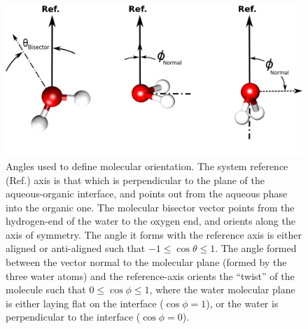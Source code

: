 \begin{figure}[h!]
\begin{center}
	\includegraphics[scale=1.0]{images/water-angles.png}
	\caption{Angles used to define molecular orientation. The system reference (Ref.) axis is that which is perpendicular to the plane of the aqueous-organic interface, and points out from the aqueous phase into the organic one. The molecular bisector vector points from the hydrogen-end of the water to the oxygen end, and orients along the axis of symmetry. The angle it forms with the reference axis is either aligned or anti-aligned such that $-1\le \cos\theta \le 1$. The angle formed between the vector normal to the molecular plane (formed by the three water atoms) and the reference-axis orients the ``twist'' of the molecule such that $0 \le \cos\phi \le 1$, where the water molecular plane is either laying flat on the interface ($\cos\phi=1$), or the water is perpendicular to the interface ($\cos\phi=0$).}
	\label{fig:water-angles}
\end{center}
\end{figure}



